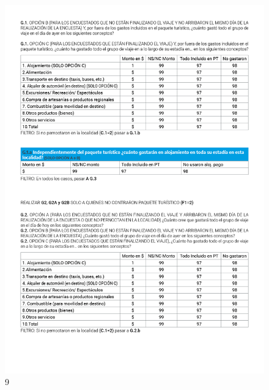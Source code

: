 \documentclass[
]{book}
\begin{document}
\begin{figure}

{\centering \includegraphics[width=1\linewidth]{imagenes/graf09} 

}

\caption{9}\label{fig:009}
\end{figure}
\end{document}
